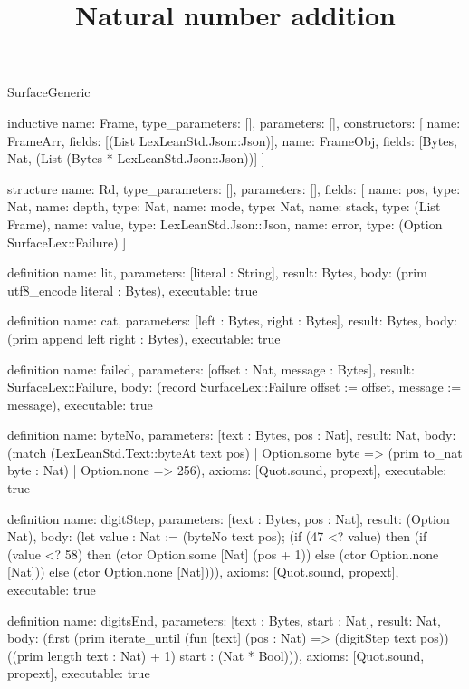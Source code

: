 \begin{lexlean}{SurfaceGeneric}
\title{Natural number addition}
\begin{semanticmodule}
inductive{
  name: Frame,
  type_parameters: [],
  parameters: [],
  constructors: [
    {name: FrameArr, fields: [(List LexLeanStd.Json::Json)]},
    {name: FrameObj, fields: [Bytes, Nat, (List (Bytes * LexLeanStd.Json::Json))]}
  ]
}

structure{
  name: Rd,
  type_parameters: [],
  parameters: [],
  fields: [
    {name: pos, type: Nat},
    {name: depth, type: Nat},
    {name: mode, type: Nat},
    {name: stack, type: (List Frame)},
    {name: value, type: LexLeanStd.Json::Json},
    {name: error, type: (Option SurfaceLex::Failure)}
  ]
}

definition{
  name: lit,
  parameters: [literal : String],
  result: Bytes,
  body: (prim utf8_encode literal : Bytes),
  executable: true
}

definition{
  name: cat,
  parameters: [left : Bytes, right : Bytes],
  result: Bytes,
  body: (prim append left right : Bytes),
  executable: true
}

definition{
  name: failed,
  parameters: [offset : Nat, message : Bytes],
  result: SurfaceLex::Failure,
  body: (record SurfaceLex::Failure {offset := offset, message := message}),
  executable: true
}

definition{
  name: byteNo,
  parameters: [text : Bytes, pos : Nat],
  result: Nat,
  body: (match (LexLeanStd.Text::byteAt text pos)
    | Option.some byte => (prim to_nat byte : Nat)
    | Option.none => 256),
  axioms: [Quot.sound, propext],
  executable: true
}

definition{
  name: digitStep,
  parameters: [text : Bytes, pos : Nat],
  result: (Option Nat),
  body: (let value : Nat := (byteNo text pos); (if (47 <? value) then (if (value <? 58) then (ctor Option.some [Nat] (pos + 1)) else (ctor Option.none [Nat])) else (ctor Option.none [Nat]))),
  axioms: [Quot.sound, propext],
  executable: true
}

definition{
  name: digitsEnd,
  parameters: [text : Bytes, start : Nat],
  result: Nat,
  body: (first (prim iterate_until (fun [text] (pos : Nat) => (digitStep text pos)) ((prim length text : Nat) + 1) start : (Nat * Bool))),
  axioms: [Quot.sound, propext],
  executable: true
}


\end{semanticmodule}
\end{lexlean}
